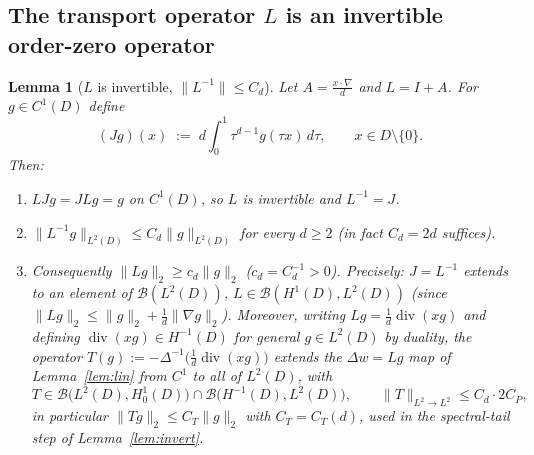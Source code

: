 \documentclass[11pt]{article}
\newtheorem{lemma}[theorem]{Lemma}
\theoremstyle{remark}
\newcommand{\norm}[1]{\lVert #1\rVert}
\newcommand{\SET}[1]{\{#1\}}
\DeclareMathOperator{\diver}{div}
\begin{document}
\subsection{The transport operator $L$ is an invertible order-zero operator}

\begin{lemma}[$L$ is invertible, $\norm{L^{-1}}\le C_{d}$]\label{lem:Linv}
Let $A=\frac{x\cdot\nabla}{d}$ and $L=I+A$. For $g\in C^{1}(D)$ define
\[
(Jg)(x)\;:=\;d\int_{0}^{1}\tau^{d-1}g(\tau x)\,d\tau ,
\qquad x\in D\setminus\SET{0}.
\]
Then:
\begin{enumerate}[label=(\roman*),itemsep=1pt]
\item $LJg=JLg=g$ on $C^{1}(D)$, so $L$ is invertible and $L^{-1}=J$.
\item $\norm{L^{-1}g}_{L^{2}(D)}\le C_{d}\norm{g}_{L^{2}(D)}$ for every
$d\ge2$ (in fact $C_d=2d$ suffices).
\item Consequently $\norm{Lg}_{2}\ge c_d\norm{g}_{2}$ ($c_d=C_d^{-1}>0$).
Precisely: $J=L^{-1}$ extends to an element of $\mathcal B(L^{2}(D))$,
$L\in\mathcal B(H^{1}(D),L^{2}(D))$ (since
$\norm{Lg}_2\le\norm{g}_2+\frac1d\norm{\nabla g}_2$). Moreover, writing
$Lg=\frac1d\diver(xg)$ and defining $\diver(xg)\in H^{-1}(D)$ for general
$g\in L^{2}(D)$ by duality, the operator
$T(g):=-\Delta^{-1}\bigl(\tfrac1d\diver(xg)\bigr)$ extends the
$\Delta w=Lg$ map of Lemma~\ref{lem:lin} from $C^{1}$ to all of
$L^{2}(D)$, with
\[
T\in\mathcal B\bigl(L^{2}(D),H^{1}_{0}(D)\bigr)
\cap\mathcal B\bigl(H^{-1}(D),L^{2}(D)\bigr),
\qquad\norm{T}_{L^{2}\to L^{2}}\le C_{d}\cdot 2C_{P},
\]
in particular $\norm{Tg}_{2}\le C_{T}\norm{g}_{2}$ with
$C_T=C_{T}(d)$, used in the spectral-tail step of
Lemma~\ref{lem:invert}.
\end{enumerate}
\end{lemma}
\end{document}
